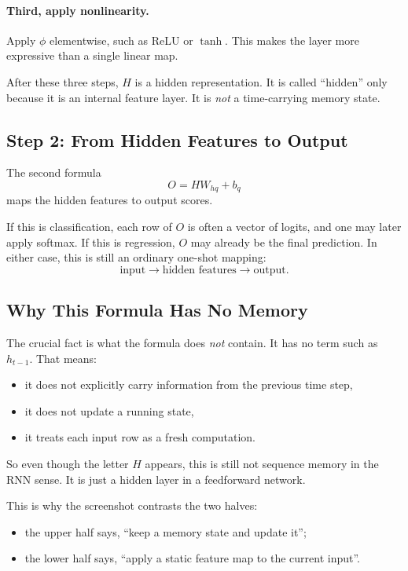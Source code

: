\documentclass[12pt,a4paper]{article}
\begin{document}
\paragraph{Third, apply nonlinearity.}
Apply \(\phi\) elementwise, such as ReLU or \(\tanh\). This makes the layer more expressive than a single linear map.

After these three steps, \(H\) is a hidden representation. It is called ``hidden'' only because it is an internal feature layer. It is \emph{not} a time-carrying memory state.

\subsection{Step 2: From Hidden Features to Output}

The second formula
\[
O = HW_{hq} + b_q
\]
maps the hidden features to output scores.

If this is classification, each row of \(O\) is often a vector of logits, and one may later apply softmax. If this is regression, \(O\) may already be the final prediction. In either case, this is still an ordinary one-shot mapping:
\[
\text{input} \rightarrow \text{hidden features} \rightarrow \text{output}.
\]

\subsection{Why This Formula Has No Memory}

The crucial fact is what the formula does \emph{not} contain. It has no term such as \(h_{t-1}\). That means:
\begin{itemize}
  \item it does not explicitly carry information from the previous time step,
  \item it does not update a running state,
  \item it treats each input row as a fresh computation.
\end{itemize}

So even though the letter \(H\) appears, this is still not sequence memory in the RNN sense. It is just a hidden layer in a feedforward network.

This is why the screenshot contrasts the two halves:
\begin{itemize}
  \item the upper half says, ``keep a memory state and update it'';
  \item the lower half says, ``apply a static feature map to the current input''.
\end{itemize}
\end{document}
